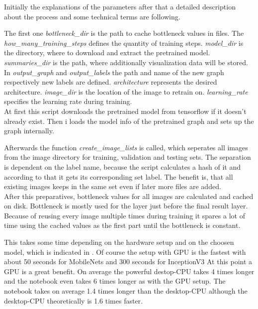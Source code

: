 Initially the explanations of the parameters after that a detailed description about the process and some technical terms are following.

The first one \textit{bottleneck_dir} is the path to cache bottleneck values in files. The \textit{how_many_training_steps} defines the quantity of training steps. \textit{model_dir} is the directory, where to download and extract the pretrained model. \textit{summaries_dir} is the path, where additionally visualization data will be stored. In \textit{output_graph} and \textit{output_labels} the path and name of the new graph respectively new labels are defined. \textit{architecture} represents the desired architecture. \textit{image_dir} is the location of the image to retrain on. \textit{learning_rate} specifies the learning rate during training. \\


At first this script downloads the pretrained model from tensorflow if it doesn't already exist. Then i loads the model info of the pretrained graph and sets up the graph internally.

Afterwards the function \textit{create_image_lists} is called, which seperates all images from the image directory for training, validation and testing sets. The separation is dependent on the label name, because the script calculates a hash of it and according to that it gets its corresponding set label. The benefit is, that all existing images keeps in the same set even if later more files are added. \\

After this preparatives, bottleneck values for all images are calculated and cached on disk. Bottleneck is mostly used for the layer just before the final result layer. Because of reusing every image multiple times during training it spares a lot of time using the cached values as the first part until the bottleneck is constant.

This takes some time depending on the hardware setup and on the choosen model, which is indicated in . Of course the setup with GPU is the fastest with about 50 seconds for MobileNets and 300 seconds for InceptionV3 At this point a GPU is a great benefit. On average the powerful destop-CPU takes 4 times longer and the notebook even takes 6 times longer as with the GPU setup. The notebook takes on average 1.4 times longer than the desktop-CPU although the desktop-CPU theoretically is 1.6 times faster.

